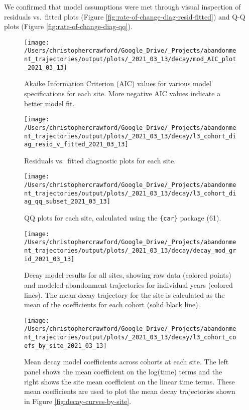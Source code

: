 \documentclass[9pt,twocolumn,twoside,lineno]{pnas-new}
\begin{document}
We confirmed that model assumptions were met through visual inspection of residuals vs.~fitted plots (Figure \ref{fig:rate-of-change-diag-resid-fitted}) and Q-Q plots (Figure \ref{fig:rate-of-change-diag-qq}).



\begin{figure}
\texttt{[image: /Users/christophercrawford/Google\_Drive/\_Projects/abandonment\_trajectories/output/plots/\_2021\_03\_13/decay/mod\_AIC\_plot\_2021\_03\_13]} \caption{Akaike Information Criterion (AIC) values for various model specifications for each site. More negative AIC values indicate a better model fit.}\label{fig:AIC}
\end{figure}



\begin{figure}
\texttt{[image: /Users/christophercrawford/Google\_Drive/\_Projects/abandonment\_trajectories/output/plots/\_2021\_03\_13/decay/l3\_cohort\_diag\_resid\_v\_fitted\_2021\_03\_13]} \caption{Residuals vs.~fitted diagnostic plots for each site.}\label{fig:diag-resid-fitted}
\end{figure}



\begin{figure}
\texttt{[image: /Users/christophercrawford/Google\_Drive/\_Projects/abandonment\_trajectories/output/plots/\_2021\_03\_13/decay/l3\_cohort\_diag\_qq\_subset\_2021\_03\_13]} \caption{QQ plots for each site, calculated using the \texttt{\{car\}} package (61).}\label{fig:diag-qq}
\end{figure}



\begin{figure}
\texttt{[image: /Users/christophercrawford/Google\_Drive/\_Projects/abandonment\_trajectories/output/plots/\_2021\_03\_13/decay/decay\_mod\_grid\_2021\_03\_13]} \caption{Decay model results for all sites, showing raw data (colored points) and modeled abandonment trajectories for individual years (colored lines). The mean decay trajectory for the site is calculated as the mean of the coefficients for each cohort (solid black line).}\label{fig:decay-model-grid}
\end{figure}



\begin{figure}
\texttt{[image: /Users/christophercrawford/Google\_Drive/\_Projects/abandonment\_trajectories/output/plots/\_2021\_03\_13/decay/l3\_cohort\_coefs\_by\_site\_2021\_03\_13]} \caption{Mean decay model coefficients across cohorts at each site. The left panel shows the mean coefficient on the log(time) terms and the right shows the site mean coefficient on the linear time terms. These mean coefficients are used to plot the mean decay trajectories shown in Figure \ref{fig:decay-curves-by-site}.}\label{fig:decay-mod-coef}
\end{figure}
\end{document}
